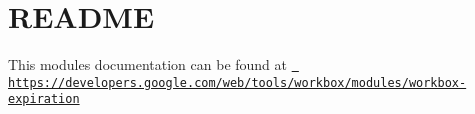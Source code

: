 \chapter{README}
\hypertarget{md_node__modules_2workbox-expiration_2README}{}\label{md_node__modules_2workbox-expiration_2README}
This module\textquotesingle{}s documentation can be found at \href{https://developers.google.com/web/tools/workbox/modules/workbox-expiration}{\texttt{ https\+://developers.\+google.\+com/web/tools/workbox/modules/workbox-\/expiration}} 